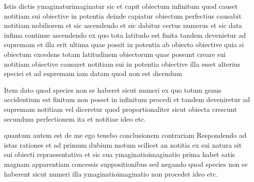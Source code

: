 \documentclass[twoside, openright]{report}
\begin{document}
        \pstart
        Istis dictis ymaginaturimaginatur sic et capit obiectum infinitum quod causet notitiam sui obiective in potentia deinde capiatur obiectum perfectius causabit notitiam nobiliorem et sic ascendendo et sic dabitur certus numerus et sic data infima continue ascendendo ex quo tota latitudo est finita tandem devenietur ad supremam et illa erit ultima quae possit in potentia ab obiecto obiective quia si obiectum excedens totam latitudinem obiectorum quae possunt creare sui notitiam obiective causaret notitiam sui in potentia obiective illa esset alterius speciei et ad supremam iam datam quod non est dicendum
        \pend
     
        \pstart
        Item dato quod species non se haberet sicut numeri ex quo totum genus accidentium est finitum non posset in infinitum procedi et tandem deveniretur ad supremam notitiam vel diceretur quod proportionaliter sicut obiecta crescunt secundum perfectionem ita et notitiae ideo etc.
        \pend
     
        \pstart
        quantum autem est de me ego tenebo conclusionem contrariam Respondendo ad istas rationes et ad primum dubium motum scilicet an notitia ex sui natura sit sui obiecti repraesentativa et sic sua ymaginatioimaginatio prima habet satis magnam apparentiam concessis suppositionibus sed negando quod species non se haberent sicut numeri illa ymaginatioimaginatio non procedet ideo etc.
        \pend
        
        \endnumbering
        
     
        
\end{document}
